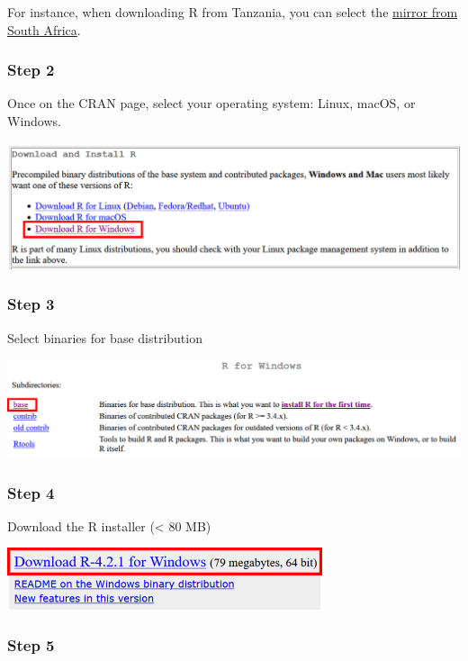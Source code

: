 \documentclass[
  letterpaper,
  DIV=11,
  numbers=noendperiod]{scrreprt}
\begin{document}
For instance, when downloading R from Tanzania, you can select the
\href{https://cran.mirror.ac.za/}{mirror from South Africa}.

\hypertarget{step-2-1}{%
\subsubsection{Step 2}\label{step-2-1}}

Once on the CRAN page, select your operating system: Linux, macOS, or
Windows.

\includegraphics{./images/paste-23A4B16E.png}

\hypertarget{step-3-1}{%
\subsubsection{Step 3}\label{step-3-1}}

Select binaries for base distribution

\includegraphics{./images/paste-0739A4C1.png}

\hypertarget{step-4}{%
\subsubsection{Step 4}\label{step-4}}

Download the R installer (\textless{} 80 MB)

\includegraphics[width=3.64583in,height=\textheight]{./images/paste-9624855F.png}

\hypertarget{step-5}{%
\subsubsection{Step 5}\label{step-5}}
\end{document}
